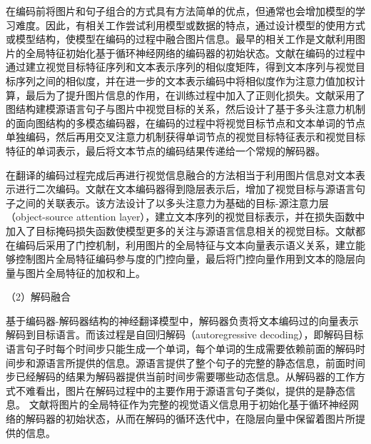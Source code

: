 在编码前将图片和句子组合的方式具有方法简单的优点，但通常也会增加模型的学习难度。因此，有相关工作尝试利用模型或数据的特点，通过设计模型的使用方式或模型结构，使模型在编码的过程中融合图片信息。最早的相关工作是文献\cite{18_DBLP:conf/emnlp/CalixtoL17,52_DBLP:journals/corr/ElliottFH15}利用图片的全局特征初始化基于循环神经网络的编码器的初始状态。文献\cite{94_DBLP:conf/aaai/YangCZ020}在编码的过程中通过建立视觉目标特征序列和文本表示序列的相似度矩阵，得到文本序列与视觉目标序列之间的相似度，并在进一步的文本表示编码中将相似度作为注意力值加权计算，最后为了提升图片信息的作用，在训练过程中加入了正则化损失。文献\cite{33_yin-etal-2020-novel}采用了图结构建模源语言句子与图片中视觉目标的关系，然后设计了基于多头注意力机制的面向图结构的多模态编码器，在编码的过程中将视觉目标节点和文本单词的节点单独编码，然后再用交叉注意力机制获得单词节点的视觉目标特征表示和视觉目标特征的单词表示，最后将文本节点的编码结果传递给一个常规的解码器。

在翻译的编码过程完成后再进行视觉信息融合的方法相当于利用图片信息对文本表示进行二次编码。文献\cite{48_DBLP:conf/aaai/WangX21}在文本编码器得到隐层表示后，增加了视觉目标与源语言句子之间的关联表示。该方法设计了以多头注意力为基础的目标-源注意力层（object-source attention layer），建立文本序列的视觉目标表示，并在损失函数中加入了目标掩码损失函数使模型更多的关注与源语言信息相关的视觉目标。文献\cite{20_wu-etal-2021-good,22_li-etal-2021-vision}都在编码后采用了门控机制，利用图片的全局特征与文本向量表示语义关系，建立能够控制图片全局特征编码参与度的门控向量，最后将门控向量作用到文本的隐层向量与图片全局特征的加权和上。

{\sffamily （2）解码融合}

基于编码器-解码器结构的神经翻译模型中，解码器负责将文本编码过的向量表示解码到目标语言。而该过程是自回归解码（autoregressive decoding），即解码目标语言句子时每个时间步只能生成一个单词，每个单词的生成需要依赖前面的解码时间步和源语言所提供的信息。源语言提供了整个句子的完整的静态信息，前面时间步已经解码的结果为解码器提供当前时间步需要哪些动态信息。从解码器的工作方式不难看出，图片在解码过程中的主要作用于源语言句子类似，提供的是静态信息。
文献\cite{18_DBLP:conf/emnlp/CalixtoL17,52_DBLP:journals/corr/ElliottFH15,56_zhou-etal-2018-visual,95_zheng-etal-2018-ensemble}将图片的全局特征作为完整的视觉语义信息用于初始化基于循环神经网络的解码器的初始状态，从而在解码的循环迭代中，在隐层向量中保留着图片所提供的信息。

